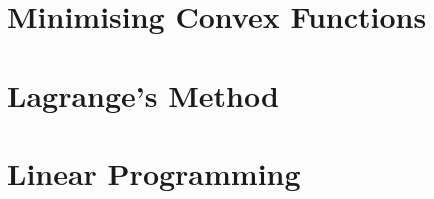 \documentclass[british,11pt,a4paper]{report}
\begin{document}
\maketitle
\tableofcontents
\chapter{Minimising Convex Functions}

\chapter{Lagrange's Method}

\chapter{Linear Programming}

\end{document}
